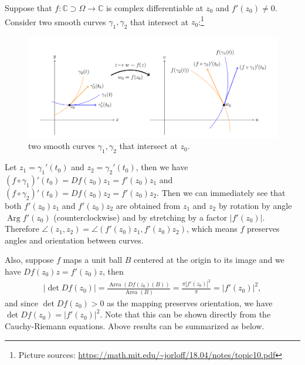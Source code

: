 \documentclass[11pt]{book}
\theoremstyle{definition}
\numberwithin{equation}{chapter}
\begin{document}
Suppose that $f: \mathbb{C} \supset \Omega \to \mathbb{C}$ is complex differentiable at $z_0$ and $f'(z_0) \neq 0$. Consider two smooth curves $\gamma_1, \gamma_2$ that intersect at $z_0$:\footnote{Picture sources: \url{https://math.mit.edu/~jorloff/18.04/notes/topic10.pdf}}
\begin{figure}[H]
    \centering
    \includegraphics[width=1\textwidth]{conformal_map.png}
    \caption{two smooth curves $\gamma_1, \gamma_2$ that intersect at $z_0$.}
    \label{fig:two_curve}
\end{figure}
Let $z_1 = \gamma_1'(t_0)$ and $z_2 = \gamma_2'(t_0)$, then we have $(f \circ \gamma_1)'(t_0) = Df(z_0) z_1 = f'(z_0) z_1$ and $(f \circ \gamma_2)'(t_0) = Df(z_0) z_2 = f'(z_0) z_2$. Then we can immediately see that both $f'(z_0) z_1$ and $f'(z_0) z_2$ are obtained from $z_1$ and $z_2$ by rotation by angle $\operatorname{Arg} f'(z_0)$ (counterclockwise) and by stretching by a factor $\left|f'(z_0)\right|$. Therefore $\angle (z_1, z_2) = \angle (f'(z_0) z_1, f'(z_0) z_2)$, which means $f$ preserves angles and orientation between curves.

Also, suppose $f$ maps a unit ball $B$ centered at the origin to its image and we have $Df(z_0) z = f'(z_0) z$, then 
\begin{align*}
    \left|\det Df(z_0) \right| = \frac{\operatorname{Area} (Df(z_0)(B))}{\operatorname{Area}(B)} = \frac{\pi \left|f'(z_0)\right|^2}{\pi} = \left|f'(z_0)\right|^2,
\end{align*}
and since $\det Df(z_0) > 0$ as the mapping preserves orientation, we have $\det Df(z_0) = \left|f'(z_0)\right|^2$. Note that this can be shown directly from the Cauchy-Riemann equations. Above results can be summarized as below.

\medskip
\end{document}
